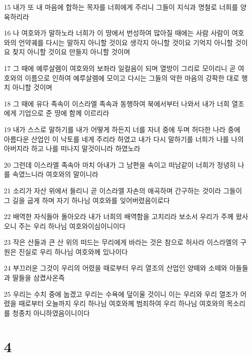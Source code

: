 \par 15 내가 또 내 마음에 합하는 목자를 너희에게 주리니 그들이 지식과 명철로 너희를 양육하리라
\par 16 나 여호와가 말하노라 너희가 이 땅에서 번성하여 많아질 때에는 사람 사람이 여호와의 언약궤를 다시는 말하지 아니할 것이요 생각지 아니할 것이요 기억지 아니할 것이요 찾지 아니할 것이요 만들지 아니할 것이며
\par 17 그 때에 예루살렘이 여호와의 보좌라 일컬음이 되며 열방이 그리로 모이리니 곧 여호와의 이름으로 인하여 예루살렘에 모이고 다시는 그들의 악한 마음의 강팍한 대로 행치 아니할 것이며
\par 18 그 때에 유다 족속이 이스라엘 족속과 동행하여 북에서부터 나와서 내가 너희 열조에게 기업으로 준 땅에 함께 이르리라
\par 19 내가 스스로 말하기를 내가 어떻게 하든지 너를 자녀 중에 두며 허다한 나라 중에 아름다운 산업인 이 낙토를 네게 주리라 하였고 내가 다시 말하기를 너희가 나를 나의 아버지라 하고 나를 떠나지 말것이니라 하였노라
\par 20 그런데 이스라엘 족속아 마치 아내가 그 남편을 속이고 떠남같이 너희가 정녕히 나를 속였느니라 여호와의 말이니라
\par 21 소리가 자산 위에서 들리니 곧 이스라엘 자손의 애곡하며 간구하는 것이라 그들이 그 길을 굽게 하며 자기 하나님 여호와를 잊어버렸음이로다
\par 22 배역한 자식들아 돌아오라 내가 너희의 배역함을 고치리라 보소서 우리가 주께 왔사오니 주는 우리 하나님 여호와이심이니이다
\par 23 작은 산들과 큰 산 위의 떠드는 무리에게 바라는 것은 참으로 허사라 이스라엘의 구원은 진실로 우리 하나님 여호와께 있나이다
\par 24 부끄러운 그것이 우리의 어렸을 때로부터 우리 열조의 산업인 양떼와 소떼와 아들들과 딸들을 삼켰사온즉
\par 25 우리는 수치 중에 눕겠고 우리는 수욕에 덮이울 것이니 이는 우리와 우리 열조가 어렸을 때로부터 오늘까지 우리 하나님 여호와께 범죄하여 우리 하나님 여호와의 목소리를 청종치 아니하였음이니이다

\chapter{4}

